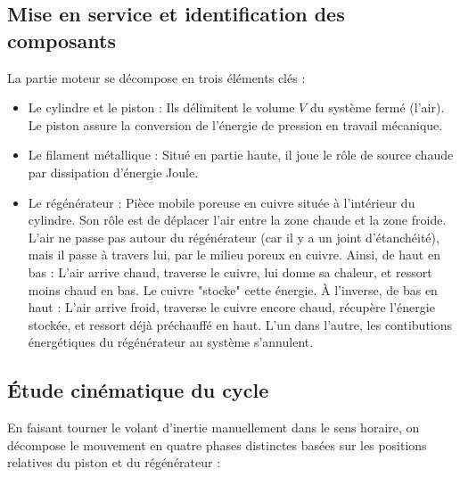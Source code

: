 \documentclass[a4paper,9pt,french]{scrartcl}
\begin{document}
\subsection{Mise en service et identification des composants}
La partie moteur se décompose en trois éléments clés :
\begin{itemize}
    \item {Le cylindre et le piston :} Ils délimitent le volume $V$ du système fermé (l'air). Le piston assure la conversion de l'énergie de pression en travail mécanique.
    \item {Le filament métallique :} Situé en partie haute, il joue le rôle de {source chaude} par dissipation d'énergie Joule.
    \item {Le régénérateur :} Pièce mobile poreuse en cuivre située à l'intérieur du cylindre. Son rôle est de déplacer l'air entre la zone chaude et la zone froide. L'air ne passe pas autour du régénérateur (car il y a un joint d'étanchéité), mais il passe à travers lui, par le milieu poreux en cuivre.
    Ainsi, de haut en bas : L'air arrive chaud, traverse le cuivre, lui donne sa chaleur, et ressort moins chaud en bas. Le cuivre "stocke" cette énergie.
    À l'inverse, de bas en haut : L'air arrive froid, traverse le cuivre encore chaud, récupère l'énergie stockée, et ressort déjà préchauffé en haut. L'un dans l'autre, les contibutions énergétiques du régénérateur au système s'annulent.

\end{itemize}

\subsection{Étude cinématique du cycle}
En faisant tourner le volant d'inertie manuellement dans le sens horaire, on décompose le mouvement en quatre phases distinctes basées sur les positions relatives du piston et du régénérateur :
\end{document}
